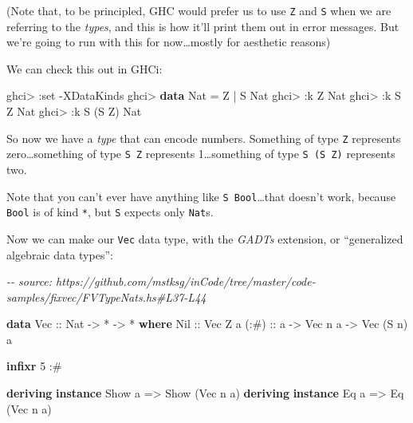 \documentclass[]{article}
\newenvironment{Shaded}{}{}
\newcommand{\CommentTok}[1]{\textcolor[rgb]{0.38,0.63,0.69}{\textit{#1}}}
\newcommand{\DataTypeTok}[1]{\textcolor[rgb]{0.56,0.13,0.00}{#1}}
\newcommand{\DecValTok}[1]{\textcolor[rgb]{0.25,0.63,0.44}{#1}}
\newcommand{\KeywordTok}[1]{\textcolor[rgb]{0.00,0.44,0.13}{\textbf{#1}}}
\newcommand{\NormalTok}[1]{#1}
\newcommand{\OperatorTok}[1]{\textcolor[rgb]{0.40,0.40,0.40}{#1}}
\newcommand{\OtherTok}[1]{\textcolor[rgb]{0.00,0.44,0.13}{#1}}
\begin{document}
(Note that, to be principled, GHC would prefer us to use
\texttt{\textquotesingle{}Z} and \texttt{\textquotesingle{}S} when we are
referring to the \emph{types}, and this is how it'll print them out in error
messages. But we're going to run with this for now\ldots mostly for aesthetic
reasons)

We can check this out in GHCi:

\begin{Shaded}
\begin{Highlighting}[]
\NormalTok{ghci}\OperatorTok{\textgreater{}} \OperatorTok{:}\NormalTok{set }\OperatorTok{{-}}\DataTypeTok{XDataKinds}
\NormalTok{ghci}\OperatorTok{\textgreater{}} \KeywordTok{data} \DataTypeTok{Nat} \OtherTok{=} \DataTypeTok{Z} \OperatorTok{|} \DataTypeTok{S} \DataTypeTok{Nat}
\NormalTok{ghci}\OperatorTok{\textgreater{}} \OperatorTok{:}\NormalTok{k }\DataTypeTok{Z}
\DataTypeTok{Nat}
\NormalTok{ghci}\OperatorTok{\textgreater{}} \OperatorTok{:}\NormalTok{k }\DataTypeTok{S} \DataTypeTok{Z}
\DataTypeTok{Nat}
\NormalTok{ghci}\OperatorTok{\textgreater{}} \OperatorTok{:}\NormalTok{k }\DataTypeTok{S}\NormalTok{ (}\DataTypeTok{S} \DataTypeTok{Z}\NormalTok{)}
\DataTypeTok{Nat}
\end{Highlighting}
\end{Shaded}

So now we have a \emph{type} that can encode numbers. Something of type
\texttt{Z} represents zero\ldots something of type \texttt{S\ Z} represents
1\ldots something of type \texttt{S\ (S\ Z)} represents two.

Note that you can't ever have anything like \texttt{S\ Bool}\ldots that doesn't
work, because \texttt{Bool} is of kind \texttt{*}, but \texttt{S} expects only
\texttt{Nat}s.

Now we can make our \texttt{Vec} data type, with the \emph{GADTs} extension, or
``generalized algebraic data types'':

\begin{Shaded}
\begin{Highlighting}[]
\CommentTok{{-}{-} source: https://github.com/mstksg/inCode/tree/master/code{-}samples/fixvec/FVTypeNats.hs\#L37{-}L44}

\KeywordTok{data} \DataTypeTok{Vec}\OtherTok{ ::} \DataTypeTok{Nat} \OtherTok{{-}\textgreater{}} \OperatorTok{*} \OtherTok{{-}\textgreater{}} \OperatorTok{*} \KeywordTok{where}
    \DataTypeTok{Nil}\OtherTok{  ::} \DataTypeTok{Vec} \DataTypeTok{Z}\NormalTok{ a}
\OtherTok{    (:\#) ::}\NormalTok{ a }\OtherTok{{-}\textgreater{}} \DataTypeTok{Vec}\NormalTok{ n a }\OtherTok{{-}\textgreater{}} \DataTypeTok{Vec}\NormalTok{ (}\DataTypeTok{S}\NormalTok{ n) a}

\KeywordTok{infixr} \DecValTok{5} \OperatorTok{:\#}

\KeywordTok{deriving} \KeywordTok{instance} \DataTypeTok{Show}\NormalTok{ a }\OtherTok{=\textgreater{}} \DataTypeTok{Show}\NormalTok{ (}\DataTypeTok{Vec}\NormalTok{ n a)}
\KeywordTok{deriving} \KeywordTok{instance} \DataTypeTok{Eq}\NormalTok{ a }\OtherTok{=\textgreater{}} \DataTypeTok{Eq}\NormalTok{ (}\DataTypeTok{Vec}\NormalTok{ n a)}
\end{Highlighting}
\end{Shaded}
\end{document}
